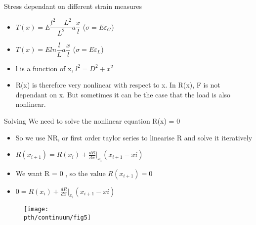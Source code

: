 	\begin{frame}
		
	\begin{block}{Stress dependant on different strain measures}
		\begin{itemize}
			\item $T(x) = E \dfrac{l^2-L^2}{L^2} a \dfrac{x}{l}$  \hfill ($\sigma =  E \varepsilon_G$)
			\item $T(x) = E ln\dfrac{l}{L} a \dfrac{x}{l}$ \hfill	($\sigma =  E \varepsilon_L$)			
		\end{itemize}
	\end{block}

	\begin{itemize}
		\item l is a function of x, $l^2=D^2+x^2$
		\item R(x) is therefore very nonlinear with respect to x. In R(x), F is not dependant on x. But sometimes it can be the case that the load is also nonlinear.	
	\end{itemize}
	
	\begin{block}{Solving}
		We need to solve the nonlinear equation R(x) = 0
		
		\begin{itemize}
			\item So we use NR, or first order taylor series to linearise R and solve it iteratively
			
			\item $R(x_{i+1}) = R(x_{i}) + \frac{dR}{dx}|_{x_{i}}(x_{i+1}-x{i})$
			\item We want R = 0 , so the value $R(x_{i+1}) = 0$
			\item  $0 = R(x_{i}) + \frac{dR}{dx}|_{x_{i}}(x_{i+1}-x{i})$		
		\end{itemize}
	\end{block}
	\end{frame}

	\begin{frame}
		\begin{figure}
			\centering
			\texttt{[image: \\pth/continuum/fig5]}
			\label{fig:fig1}
		\end{figure}
	\end{frame}


